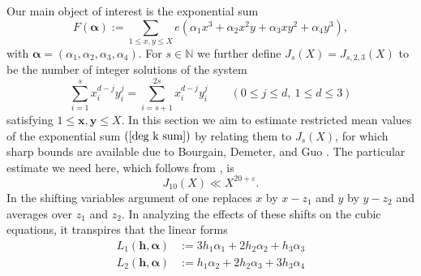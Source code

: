 \documentclass{amsart}%
\numberwithin{equation}{section}
\theoremstyle{remark}
\newcommand{\1}{\mathbbm{1}}
\begin{document}
 Our main object of interest is the exponential sum
\begin{equation}\label{deg k sum}    F(\boldsymbol{\alpha}):=\sum_{1\leq x,y\leq X}e(\alpha_1x^3+\alpha_2x^{2}y+\alpha_3xy^{2}+\alpha_{4}y^3),
\end{equation}
with $\boldsymbol{\alpha}=(\alpha_1,\alpha_2,\alpha_3,\alpha_{4}).$ 
For $s\in \mathbb{N}$ we further define
$J_s(X)=J_{s,2,3}(X)$ to be the number of integer solutions of the system
\begin{equation*}
\sum_{i=1}^s x_i^{d-j}y_i^{j} = \sum_{i=s+1}^{2s} x_i^{d-j} y_i^{j} \qquad (0 \le j \le d, \  1 \le d \le 3)
\end{equation*}
satisfying $1\le \boldsymbol{x},\boldsymbol{y} \le X$. 
In this section we aim to estimate restricted mean values of the exponential sum $(\ref{deg k sum})$ by relating them to $J_s(X)$, for which sharp bounds are available  
due to Bourgain, Demeter, and Guo \cite{MR3709122}. 
The particular estimate we need here, which follows from \cite[Theorem 1.5]{MR3709122}, is
\begin{equation}\label{J10}
J_{10}(X) \ll X^{20+\varepsilon}.
\end{equation}
In the shifting variables argument of \cite{ky2026} one replaces $x$ by $x-z_1$ and $y$ by $y-z_2$ and averages over $z_1$ and $z_2$. In analyzing the effects of these shifts on the cubic equations, it transpires that the linear forms
\begin{equation}\label{def L_1L_2}
\begin{aligned}
 L_1(\boldsymbol{h},\boldsymbol{\alpha})&:= 
 3h_1\alpha_1+2h_2\alpha_2+h_3\alpha_3 \\
  L_2(\boldsymbol{h},\boldsymbol{\alpha})&:=
  h_1\alpha_2+2h_2\alpha_3+3h_3\alpha_4
\end{aligned}
\end{equation}
\end{document}

